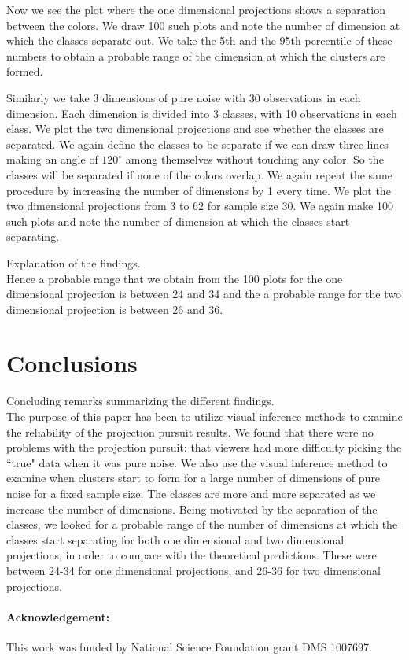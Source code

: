 \documentclass[12]{article}
\begin{document}
 
Now we see the plot where the one dimensional projections shows a separation between the colors. We draw 100 such plots and note the number of dimension at which the classes separate out. We take the 5th and the 95th percentile of these numbers to obtain a probable range of the dimension at which the clusters are formed.

Similarly we take 3 dimensions of pure noise with 30 observations in each dimension. Each dimension is divided into 3 classes, with 10 observations in each class. We plot the two dimensional projections and see whether the classes are separated. We again define the classes to be separate if we can draw three lines making an angle of $120^{\circ}$ among themselves without touching any color. So the classes will be separated if none of the colors overlap. We again repeat the same procedure by increasing the number of dimensions by 1 every time. We plot the two dimensional projections from 3 to 62 for sample size 30. We again make 100 such plots and note the number of dimension at which the classes start separating. 

{\color{red} Explanation of the findings. } \\
Hence a probable range that we obtain from the 100 plots for the one dimensional projection is between 24 and 34 and the a probable range for the two dimensional projection is between 26 and 36. 

\section{Conclusions}
{\color{red} Concluding remarks summarizing the different findings.} \\
The purpose of this paper has been to utilize  visual inference methods to examine the reliability of the projection pursuit results. We found that there were no problems with the projection pursuit: that viewers had more difficulty picking the ``true" data when it was pure noise. We also use the visual inference method to examine when clusters start to form for a large number of dimensions of pure noise for a fixed sample size. The classes are more and more separated as we increase the number of dimensions. Being motivated by the separation of the classes, we looked for a probable range of the number of dimensions at which the classes start separating for both one dimensional and two dimensional projections, in order to compare with the theoretical predictions. These were between 24-34 for one dimensional projections, and 26-36 for two dimensional projections.

\paragraph{Acknowledgement:}
%
This work was funded by National Science Foundation grant DMS 1007697.



\end{document}

